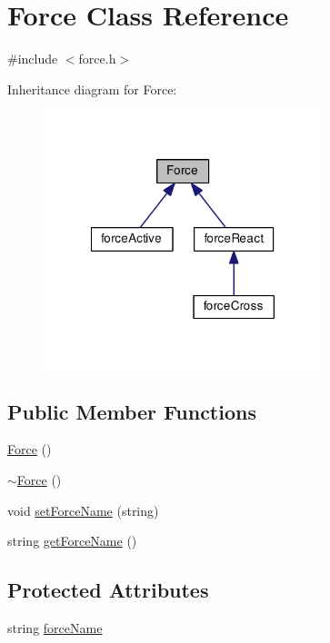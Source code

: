 \hypertarget{class_force}{\section{Force Class Reference}
\label{class_force}
}


{\ttfamily \#include $<$force.\-h$>$}



Inheritance diagram for Force\-:\nopagebreak
\begin{figure}[H]
\begin{center}
\leavevmode
\includegraphics[width=230pt]{class_force__inherit__graph}
\end{center}
\end{figure}
\subsection*{Public Member Functions}
\begin{DoxyCompactItemize}
\item 
\hyperlink{class_force_a00983e3bbc206a00bb9253deafc4e424}{Force} ()
\item 
\hyperlink{class_force_a8767ca332cee738a462befe1bfbfa454}{$\sim$\-Force} ()
\item 
void \hyperlink{class_force_aefb0b71694f6ffbfe1ee06516f5536c3}{set\-Force\-Name} (string)
\item 
string \hyperlink{class_force_a8431fcc0edd27e3edb77f8176bec6908}{get\-Force\-Name} ()
\end{DoxyCompactItemize}
\subsection*{Protected Attributes}
\begin{DoxyCompactItemize}
\item 
string \hyperlink{class_force_a50b8739b17f549bd250936b0251ca571}{force\-Name}
\end{DoxyCompactItemize}


